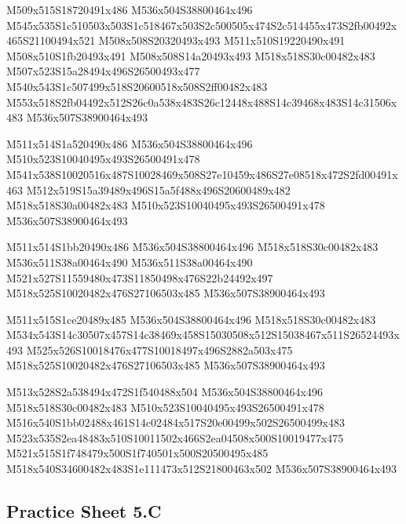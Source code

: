 \documentclass{article}
\begin{document}
\begin{multicols}{5}
\begin{center}

M509x515S18720491x486 %
M536x504S38800464x496 %
M545x535S1c510503x503S1c518467x503S2c500505x474S2c514455x473S2fb00492x465S21100494x521 %
M508x508S20320493x493 %
M511x510S19220490x491 %
M508x510S1fb20493x491 %
M508x508S14a20493x493 %
M518x518S30c00482x483 %
M507x523S15a28494x496S26500493x477 %
M540x543S1c507499x518S20600518x508S2ff00482x483 %
M553x518S2fb04492x512S26c0a538x483S26c12448x488S14c39468x483S14c31506x483 %
M536x507S38900464x493 %
\vfil
\columnbreak

M511x514S1a520490x486 %
M536x504S38800464x496 %
M510x523S10040495x493S26500491x478 %
M541x538S10020516x487S10028469x508S27e10459x486S27e08518x472S2fd00491x463 %
M512x519S15a39489x496S15a5f488x496S20600489x482 %
M518x518S30a00482x483 %
M510x523S10040495x493S26500491x478 %
M536x507S38900464x493 %
\vfil
\columnbreak

M511x514S1bb20490x486 %
M536x504S38800464x496 %
M518x518S30c00482x483 %
M536x511S38a00464x490 %
M536x511S38a00464x490 %
M521x527S11559480x473S11850498x476S22b24492x497 %
M518x525S10020482x476S27106503x485 %
M536x507S38900464x493 %
\vfil
\columnbreak

M511x515S1ce20489x485 %
M536x504S38800464x496 %
M518x518S30c00482x483 %
M534x543S14c30507x457S14c38469x458S15030508x512S15038467x511S26524493x493 %
M525x526S10018476x477S10018497x496S2882a503x475 %
M518x525S10020482x476S27106503x485 %
M536x507S38900464x493 %
\vfil
\columnbreak

M513x528S2a538494x472S1f540488x504 %
M536x504S38800464x496 %
M518x518S30c00482x483 %
M510x523S10040495x493S26500491x478 %
M516x540S1bb02488x461S14c02484x517S20e00499x502S26500499x483 %
M523x535S2ea48483x510S10011502x466S2ea04508x500S10019477x475 %
M521x515S1f748479x500S1f740501x500S20500495x485 %
M518x540S34600482x483S1e111473x512S21800463x502 %
M536x507S38900464x493 %
\vfil

\end{center}
\end{multicols}

\subsection{Practice Sheet 5.C}
\end{document}
